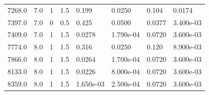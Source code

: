 \documentclass[preview]{standalone}
\begin{document}
{{\begin{tabular}{L{1.2cm}C{1.2cm} C{0.3cm}C{0.5cm} C{1.4cm}C{1.4cm} C{1.4cm}C{1.4cm}}
  7268.0  &   7.0  & 1     & 1.5 &  0.199  & 0.0250  & 0.104 &  0.0174   \\ 
  7397.0  &   7.0  & 0     & 0.5 &  0.425  & 0.0500  & 0.0377 &  3.400e-03   \\ 
  7409.0  &   7.0  & 1     & 1.5 &  0.0278  & 1.790e-04  & 0.0720 &  3.600e-03   \\ 
  7774.0  &   8.0  & 1     & 1.5 &  0.316  & 0.0250  & 0.120 &  8.900e-03   \\ 
  7866.0  &   8.0  & 1     & 1.5 &  0.0264  & 1.700e-04  & 0.0720 &  3.600e-03   \\ 
  8133.0  &   8.0  & 1     & 1.5 &  0.0226  & 8.000e-04  & 0.0720 &  3.600e-03   \\ 
  8359.0  &   8.0  & 1     & 1.5 &  1.650e-03  & 2.500e-04  & 0.0720 &  3.600e-03   \\ 
\hline 
\end{tabular} 

}}
\end{document}
